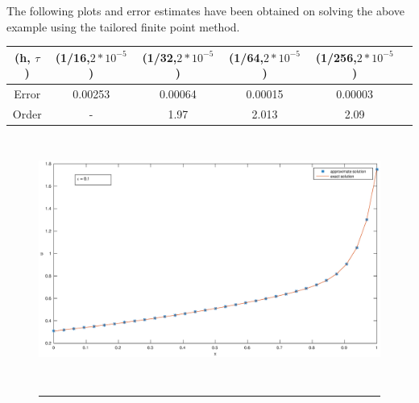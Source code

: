 The following plots and error estimates have been obtained on solving the above example using the tailored finite point method.\\

\begin{tabular}{|c|c|c|c|c|c|}
   \hline
   (h, $\tau$)  & (1/16,$2*10^{-5}$)  & (1/32,$2*10^{-5}$) & (1/64,$2*10^{-5}$) &(1/256,$2*10^{-5}$)\\
  \hline
  Error  & 0.00253  & 0.00064 & 0.00015 & 0.00003\\
  \hline
  Order & -  &  1.97  & 2.013 & 2.09\\
\hline
\end{tabular}

\clearpage

\begin{figure}[htbp]
	\centering
		\includegraphics[height=8cm]{Figures/explicit5_2.eps}\\
		\rule{35em}{0.5pt}
	\caption[Parablic]{}
\end{figure}



